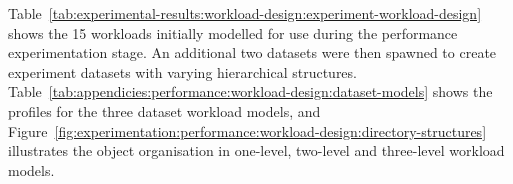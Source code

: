Table~\ref{tab:experimental-results:workload-design:experiment-workload-design} shows the \num{15} workloads initially modelled for use during the performance experimentation stage. An additional two datasets were then spawned to create experiment datasets with varying hierarchical structures. Table~\ref{tab:appendicies:performance:workload-design:dataset-models} shows the profiles for the three dataset workload models, and Figure~\ref{fig:experimentation:performance:workload-design:directory-structures} illustrates the object organisation in one-level, two-level and three-level workload models.

\tablespacing

\bodyspacing

\begin{comment}
\tablespacing

\bodyspacing

\tablespacing
tex}
\bodyspacing
\end{comment}

\begin{comment}
\begin{figure}
 \centering
 \framebox[\textwidth]{
 
 }
 \caption{Digital object component structure}
 \label{fig:experimentation:performance:test-set-up:workload-model:experimentation.workload-hierarchical-structures}
\end{figure}
\end{comment}

